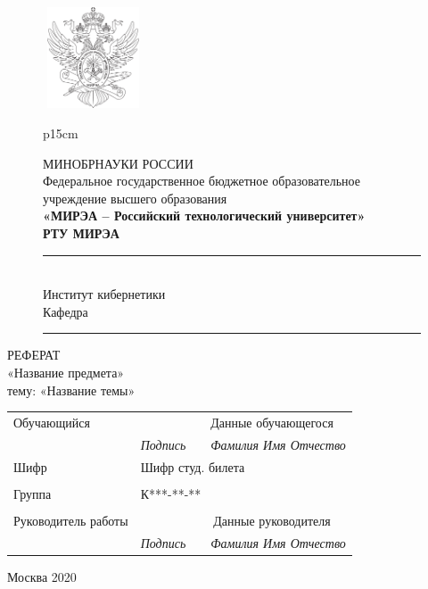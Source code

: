 \begin{center} 
    \begin{figure}[h]
        \centering
        \includegraphics[width=30mm, height=30mm]{inc/img/Gerb.png}
        \label{fig:Gerb}
        \begin{tabular}{p{15cm}}
            \begin{center}
                \small{МИНОБРНАУКИ РОССИИ}\\
                \small{Федеральное государственное бюджетное образовательное учреждение высшего образования}\\
                \textbf{«МИРЭА – Российский технологический университет»}\\
                \textbf{РТУ МИРЭА}\\
                \rule{\linewidth}{1pt}\\[-0.25cm]
                \small{Институт кибернетики}\\
                \small{Кафедра }\\[-0.45cm]
                \rule{\linewidth}{.1pt}
            \end{center}
        \end{tabular}
    \end{figure}
    
\Large РЕФЕРАТ \\[4pt] %
 «Название предмета»\\[4pt]
 тему: «Название темы»
\end{center}
\vspace{8pt}
\large{\begin{center}
    \begin{tabular}{p{4.99cm}p{4cm}p{.01cm}p{4cm}}
    Обучающийся & &\multicolumn{2}{c}{Данные обучающегося}\\ 
        \cline{2-2}\cline{4-4}
    & \multicolumn{1}{c}{\small{\textit{Подпись}}} & & \multicolumn{1}{c}{\small{\textit{Фамилия Имя Отчество}}} \\
    Шифр & \multicolumn{3}{l}{Шифр студ. билета}\\\cline{2-2}
     & & & \\
    Группа & \multicolumn{3}{l}{К***-**-**}\\\cline{2-2}
     & & & \\
    Руководитель работы & &\multicolumn{2}{c}{Данные руководителя}\\ 
        \cline{2-2}\cline{4-4}
    & \multicolumn{1}{c}{\small{\textit{Подпись}}} & & \multicolumn{1}{c}{\small{\textit{Фамилия Имя Отчество}}} \\
    \end{tabular}
\end{center}}
\vfill
\begin{center} 
\large Москва 2020
\end{center} 

\thispagestyle{empty}